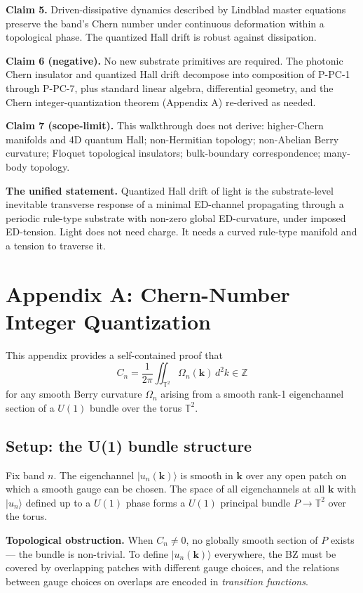 \documentclass[11pt,a4paper]{article}
\begin{document}
\textbf{Claim 5.} Driven-dissipative dynamics described by Lindblad master equations preserve the band's Chern number under continuous deformation within a topological phase. The quantized Hall drift is robust against dissipation.

\textbf{Claim 6 (negative).} No new substrate primitives are required. The photonic Chern insulator and quantized Hall drift decompose into composition of P-PC-1 through P-PC-7, plus standard linear algebra, differential geometry, and the Chern integer-quantization theorem (Appendix A) re-derived as needed.

\textbf{Claim 7 (scope-limit).} This walkthrough does not derive: higher-Chern manifolds and 4D quantum Hall; non-Hermitian topology; non-Abelian Berry curvature; Floquet topological insulators; bulk-boundary correspondence; many-body topology.

\textbf{The unified statement.} Quantized Hall drift of light is the substrate-level inevitable transverse response of a minimal ED-channel propagating through a periodic rule-type substrate with non-zero global ED-curvature, under imposed ED-tension. Light does not need charge. It needs a curved rule-type manifold and a tension to traverse it.

\appendix

\section{Appendix A: Chern-Number Integer Quantization}

This appendix provides a self-contained proof that
\[
C_n = \frac{1}{2\pi}\iint_{\mathbb{T}^2}\Omega_n(\mathbf{k})\, d^2k \in \mathbb{Z}
\]
for any smooth Berry curvature $\Omega_n$ arising from a smooth rank-1 eigenchannel section of a $U(1)$ bundle over the torus $\mathbb{T}^2$.

\subsection{Setup: the U(1) bundle structure}

Fix band $n$. The eigenchannel $|u_n(\mathbf{k})\rangle$ is smooth in $\mathbf{k}$ over any open patch on which a smooth gauge can be chosen. The space of all eigenchannels at all $\mathbf{k}$ with $|u_n\rangle$ defined up to a $U(1)$ phase forms a $U(1)$ principal bundle $P \to \mathbb{T}^2$ over the torus.

\textbf{Topological obstruction.} When $C_n \neq 0$, no globally smooth section of $P$ exists --- the bundle is non-trivial. To define $|u_n(\mathbf{k})\rangle$ everywhere, the BZ must be covered by overlapping patches with different gauge choices, and the relations between gauge choices on overlaps are encoded in \emph{transition functions}.
\end{document}
